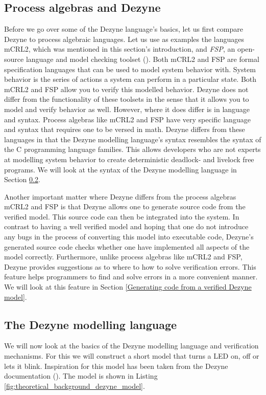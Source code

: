 \documentclass[12pt]{scrreprt}
\begin{document}
\subsection{Process algebras and Dezyne}
Before we go over some of the Dezyne language's basics, let us first compare Dezyne to process algebraic languages. Let us use as examples the languages mCRL2, which was mentioned in this section's introduction, and \textit{FSP}, an open-source language and model checking toolset (\cite{ltsa}). Both mCRL2 and FSP are formal specification languages that can be used to model system behavior with. System behavior is the series of actions a system can perform in a particular state. Both mCRL2 and FSP allow you to verify this modelled behavior. Dezyne does not differ from the functionality of these toolsets in the sense that it allows you to model and verify behavior as well. However, where it does differ is in language and syntax. Process algebras like mCRL2 and FSP have very specific language and syntax that requires one to be versed in math. Dezyne differs from these languages in that the Dezyne modelling language's syntax resembles the syntax of the C programming language families. This allows developers who are not experts at modelling system behavior to create deterministic deadlock- and livelock free programs. We will look at the syntax of the Dezyne modelling language in Section \ref{The Dezyne toolset and the Dezyne modelling language}.
\par
Another important matter where Dezyne differs from the process algebras mCRL2 and FSP is that Dezyne allows one to generate source code from the verified model. This source code can then be integrated into the system. In contrast to having a well verified model and hoping that one do not introduce any bugs in the process of converting this model into executable code, Dezyne's generated source code checks whether one have implemented all aspects of the model correctly. Furthermore, unlike process algebras like mCRL2 and FSP, Dezyne provides suggestions as to where to how to solve verification errors. This feature helps programmers to find and solve errors in a more convenient manner. We will look at this feature in Section \ref{Generating code from a verified Dezyne model}.

\subsection{The Dezyne modelling language}
\label{The Dezyne toolset and the Dezyne modelling language}
We will now look at the basics of the Dezyne modelling language and verification mechanisms. For this we will construct a short model that turns a LED on, off or lets it blink. Inspiration for this model has been taken from the Dezyne documentation (\cite{dzntut}). The model is shown in Listing \ref{fig:theoretical_background_dezyne_model}.
\end{document}

